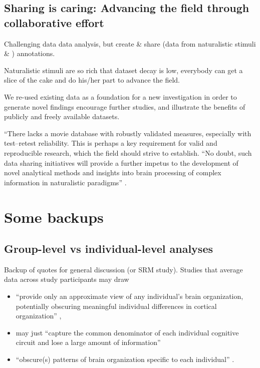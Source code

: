 \subsection{Sharing is caring: Advancing the field through collaborative effort}

%
Challenging data data analysis, but create \& share (data from naturalistic
stimuli \& ) annotations.

%
Naturalistic stimuli are so rich that dataset decay is low, everybody can get
a slice of the cake and do his/her part to advance the field.

%
We re-used existing data as a foundation for a new investigation in order to
generate novel findings encourage further studies, and illustrate the benefits
of publicly and freely available datasets.

%
``There lacks a movie database with robustly validated measures, especially with
test--retest reliability.
%
This is perhaps a key requirement for valid and reproducible research, which the
field should strive to establish.
%
``No doubt, such data sharing initiatives will provide a further impetus to the
development of novel analytical methods and insights into brain processing of
complex information in naturalistic paradigms''
\citep{sonkusare2019naturalistic}.



\pagebreak


\section{Some backups}


\subsection{Group-level vs individual-level analyses}

Backup of quotes for general discussion (or SRM study).  Studies that average
data across study participants may draw

\begin{itemize}

\item ``provide only an approximate view of any individual's brain organization,
    potentially obscuring meaningful individual differences in cortical
        organization'' \citep{laumann2015functional},

\item may just ``capture the common denominator of each individual cognitive
    circuit and lose a large amount of information''

\item ``obscure(s) patterns of brain organization specific to each individual''
    \citep{laumann2015functional}.

\end{itemize}



